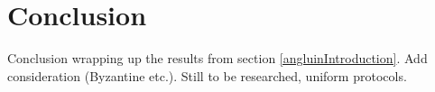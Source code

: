 \section{Conclusion} 

Conclusion wrapping up the results from section \ref{angluinIntroduction}. Add consideration (Byzantine  etc.). 
Still to be researched, uniform protocols. 

